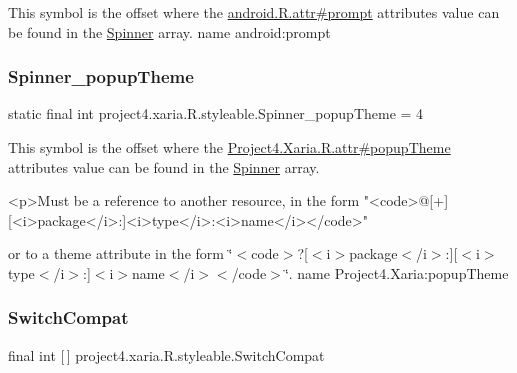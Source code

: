 This symbol is the offset where the \hyperlink{}{android.\+R.\+attr\#prompt} attribute\textquotesingle{}s value can be found in the \hyperlink{classproject4_1_1xaria_1_1R_1_1styleable_ad3bf2b8838fd43ac4b50c5c40afa1039}{Spinner} array.  name android\+:prompt \mbox{\label{classproject4_1_1xaria_1_1R_1_1styleable_a1172c7cabccd79ed9194907191930ce8}} 
\subsubsection{\texorpdfstring{Spinner\+\_\+popup\+Theme}{Spinner\_popupTheme}}
{\footnotesize\ttfamily static final int project4.\+xaria.\+R.\+styleable.\+Spinner\+\_\+popup\+Theme = 4\hspace{0.3cm}{\ttfamily [static]}}

This symbol is the offset where the \hyperlink{}{Project4.\+Xaria.\+R.\+attr\#popup\+Theme} attribute\textquotesingle{}s value can be found in the \hyperlink{classproject4_1_1xaria_1_1R_1_1styleable_ad3bf2b8838fd43ac4b50c5c40afa1039}{Spinner} array.

\begin{DoxyVerb}      <p>Must be a reference to another resource, in the form "<code>@[+][<i>package</i>:]<i>type</i>:<i>name</i></code>"
\end{DoxyVerb}
 or to a theme attribute in the form \char`\"{}$<$code$>$?\mbox{[}$<$i$>$package$<$/i$>$\+:\mbox{]}\mbox{[}$<$i$>$type$<$/i$>$\+:\mbox{]}$<$i$>$name$<$/i$>$$<$/code$>$\char`\"{}.  name Project4.\+Xaria\+:popup\+Theme \mbox{\label{classproject4_1_1xaria_1_1R_1_1styleable_a15d9950df3a97e57d9c57e4c4b7e8e87}} 
\subsubsection{\texorpdfstring{Switch\+Compat}{SwitchCompat}}
{\footnotesize\ttfamily final int \mbox{[}$\,$\mbox{]} project4.\+xaria.\+R.\+styleable.\+Switch\+Compat\hspace{0.3cm}{\ttfamily [static]}}


